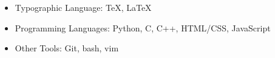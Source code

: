 \ifpublic{}
\else
  
\fi




\begin{itemize}
  \item Typographic Language: \TeX, \LaTeX
  \item Programming Languages: Python, C, C++, HTML/CSS, JavaScript
  \item Other Tools: Git, bash, vim
\end{itemize}

